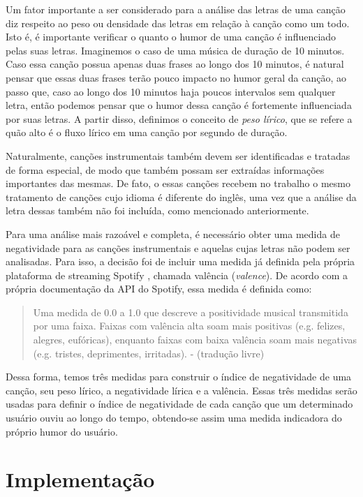 Um fator importante a ser considerado para a análise das letras de uma canção
diz respeito ao peso ou densidade das letras em relação à canção como um todo.
Isto é, é importante verificar o quanto o humor de uma canção é influenciado
pelas suas letras. Imaginemos o caso de uma música de duração de 10 minutos. 
Caso essa canção possua apenas duas frases ao longo dos 10 minutos, é natural
pensar que essas duas frases terão pouco impacto no humor geral da canção, ao
passo que, caso ao longo dos 10 minutos haja poucos intervalos sem qualquer
letra, então podemos pensar que o humor dessa canção é fortemente 
influenciada por suas letras. A partir disso, definimos o conceito de 
\textit{peso lírico}, que se refere a quão alto é o fluxo lírico em uma canção
por segundo de duração.

Naturalmente, canções instrumentais também devem ser identificadas
e tratadas de forma especial, de modo que também possam ser extraídas 
informações importantes das mesmas. De fato, o essas canções recebem no
trabalho o mesmo tratamento de canções cujo idioma é diferente do inglês,
uma vez que a análise da letra dessas também não foi incluída, como
mencionado anteriormente.

Para uma análise mais razoável e completa, é necessário obter uma medida de
negatividade para as canções instrumentais e aquelas cujas letras não podem
ser analisadas. Para isso, a decisão foi de incluir uma medida já definida
pela própria plataforma de streaming Spotify \cite{spotifyvalence}, chamada
valência (\textit{valence}). De acordo com a própria documentação da API do
Spotify, essa medida é definida como:

\begin{quote}
	Uma medida de 0.0 a 1.0 que descreve a positividade musical transmitida
	por uma faixa. Faixas com valência alta soam mais positivas (e.g. felizes,
	alegres, eufóricas), enquanto faixas com baixa valência soam mais
	negativas (e.g. tristes, deprimentes, irritadas). - (tradução livre)
\end{quote}

Dessa forma, temos três medidas para construir o índice de negatividade de
uma canção, seu peso lírico, a negatividade lírica e a valência. Essas três
medidas serão usadas para definir o índice de negatividade de cada canção
que um determinado usuário ouviu ao longo do tempo, obtendo-se assim uma
medida indicadora do próprio humor do usuário.

\section{Implementação}


